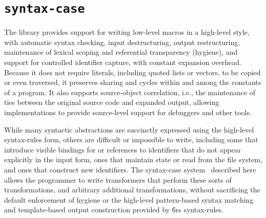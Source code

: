 \chapter{{\tt syntax-case}}
\label{syntaxcasechapter}



The  library
provides
support for writing low-level macros
in a high-level style, with automatic syntax checking, input
destructuring, output restructuring, maintenance of lexical scoping
and referential transparency (hygiene), and support for controlled
identifier capture, with constant expansion overhead.  Because it does
not require literals, including quoted lists or vectors, to be copied
or even traversed, it preserves sharing and cycles within and among
the constants of a program.  It also supports source-object
correlation, i.e., the maintenance of ties between the original source
code and expanded output, allowing implementations to provide
source-level support for debuggers and other tools.

\begin{rationale}
While many syntactic abstractions are succinctly expressed using the
high-level {\cf syntax-rules} form, others are difficult or impossible
to write, including some that introduce visible bindings for or references
to identifiers that do not appear explicitly in the input form, ones that
maintain state or read from the file system, and ones that construct new
identifiers.
The {\cf syntax-case} system~\cite{syntacticabstraction} described here
allows the programmer to write transformers that perform these sorts of
transformations, and arbitrary additional transformations, without
sacrificing the default enforcement of hygiene or the high-level
pattern-based syntax matching and template-based output construction
provided by {\r6rs} {\cf syntax-rules}.
\end{rationale}

